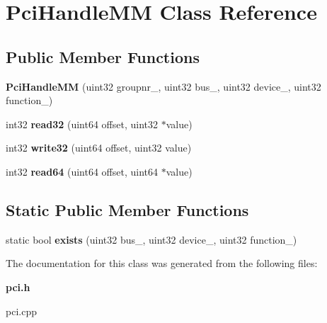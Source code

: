 \section{Pci\+Handle\+MM Class Reference}
\label{classPciHandleMM}
\subsection*{Public Member Functions}
\begin{DoxyCompactItemize}
\item 
{\bfseries Pci\+Handle\+MM} (uint32 groupnr\+\_\+, uint32 bus\+\_\+, uint32 device\+\_\+, uint32 function\+\_\+)\label{classPciHandleMM_ad228ca4f3665b17592fdf43229c8a776}

\item 
int32 {\bfseries read32} (uint64 offset, uint32 $\ast$value)\label{classPciHandleMM_a75b8adf35f6ef1bda3228cf78d07e4d7}

\item 
int32 {\bfseries write32} (uint64 offset, uint32 value)\label{classPciHandleMM_af57465df47969e4ca08b40cb964b5ef5}

\item 
int32 {\bfseries read64} (uint64 offset, uint64 $\ast$value)\label{classPciHandleMM_a1d9e24e51c83e17aeffd6eb4f1e8ff2c}

\end{DoxyCompactItemize}
\subsection*{Static Public Member Functions}
\begin{DoxyCompactItemize}
\item 
static bool {\bfseries exists} (uint32 bus\+\_\+, uint32 device\+\_\+, uint32 function\+\_\+)\label{classPciHandleMM_ade749e6d8c613e46189e3563d8520ab8}

\end{DoxyCompactItemize}


The documentation for this class was generated from the following files\+:\begin{DoxyCompactItemize}
\item 
{\bf pci.\+h}\item 
pci.\+cpp\end{DoxyCompactItemize}

